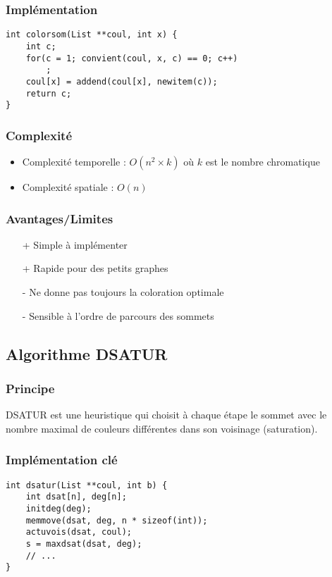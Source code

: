 \documentclass[a4paper,11pt]{article}
\begin{document}
\subsubsection{Implémentation}
\begin{verbatim}
int colorsom(List **coul, int x) {
    int c;
    for(c = 1; convient(coul, x, c) == 0; c++)
        ;
    coul[x] = addend(coul[x], newitem(c));
    return c;
}
\end{verbatim}

\subsubsection{Complexité}
\begin{itemize}
\item Complexité temporelle : $O(n^2 \times k)$ où $k$ est le nombre chromatique
\item Complexité spatiale : $O(n)$
\end{itemize}

\subsubsection{Avantages/Limites}
\begin{itemize}
\item [+] Simple à implémenter
\item [+] Rapide pour des petits graphes
\item [-] Ne donne pas toujours la coloration optimale
\item [-] Sensible à l'ordre de parcours des sommets
\end{itemize}

\subsection{Algorithme DSATUR}
\subsubsection{Principe}
DSATUR est une heuristique qui choisit à chaque étape le sommet avec le nombre maximal de couleurs différentes dans son voisinage (saturation).

\subsubsection{Implémentation clé}
\begin{verbatim}
int dsatur(List **coul, int b) {
    int dsat[n], deg[n];
    initdeg(deg);
    memmove(dsat, deg, n * sizeof(int));
    actuvois(dsat, coul);
    s = maxdsat(dsat, deg);
    // ...
}
\end{verbatim}
\end{document}
